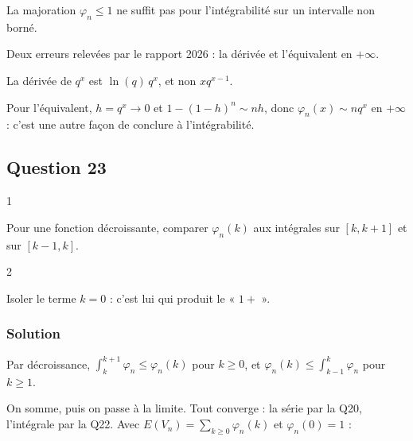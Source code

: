 \documentclass[11pt,a4paper]{article}
\newcommand{\equationajustee}[1]{%
  \sbox{\boiteequation}{$\displaystyle #1$}%
  \ifdim\wd\boiteequation>\linewidth
    \[\resizebox{\linewidth}{!}{\usebox{\boiteequation}}\]%
  \else
    \[#1\]%
  \fi}
\begin{document}
\begin{piege}

La majoration \(\varphi_n\le1\) ne suffit pas pour l'intégrabilité sur un intervalle non borné.

\end{piege}

\begin{piege}

Deux erreurs relevées par le rapport 2026 : la dérivée et l'équivalent en \(+\infty\).

La dérivée de \(q^x\) est \(\ln(q)\,q^x\), et non \(xq^{x-1}\).

Pour l'équivalent, \(h=q^x\to0\) et \(1-(1-h)^n\sim nh\), donc \(\varphi_n(x)\sim nq^x\) en \(+\infty\) : c'est une autre façon de conclure à l'intégrabilité.

\end{piege}

\hypertarget{question-23}{%
\subsection{Question 23}\label{question-23}}

\begin{indication}{1}

Pour une fonction décroissante, comparer \(\varphi_n(k)\) aux intégrales sur \([k,k+1]\) et sur \([k-1,k]\).

\end{indication}

\begin{indication}{2}

Isoler le terme \(k=0\) : c'est lui qui produit le « \(1+\) ».

\end{indication}

\hypertarget{solution-22}{%
\subsubsection{Solution}\label{solution-22}}

Par décroissance, \(\int_k^{k+1}\varphi_n\le\varphi_n(k)\) pour \(k\ge0\), et \(\varphi_n(k)\le\int_{k-1}^k\varphi_n\) pour \(k\ge1\).

On somme, puis on passe à la limite. Tout converge : la série par la Q20, l'intégrale par la Q22. Avec \(E(V_n)=\sum_{k\ge0}\varphi_n(k)\) et \(\varphi_n(0)=1\) :
\equationajustee{\boxed{\int_0^{+\infty}\varphi_n\le E(V_n)\le1+\int_0^{+\infty}\varphi_n .}}
\end{document}
